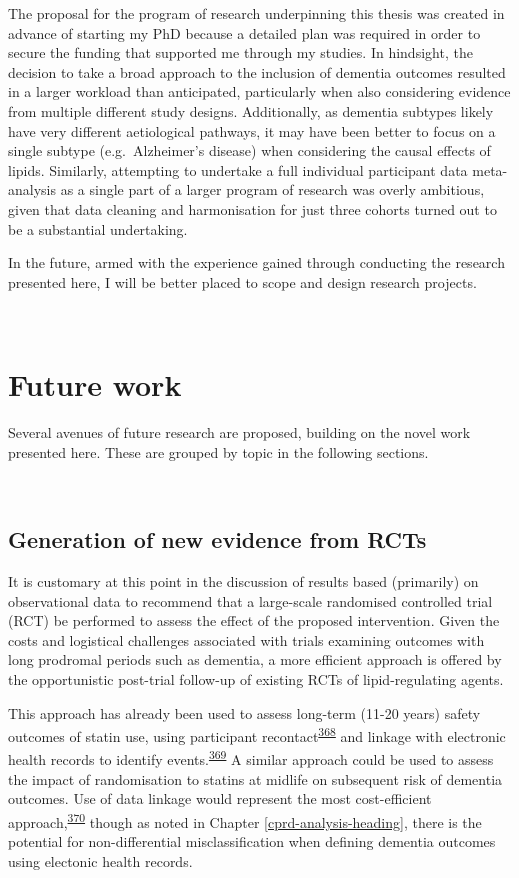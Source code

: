 \documentclass[a4paper, twoside]{templates/ociamthesis}
\begin{document}
The proposal for the program of research underpinning this thesis was created in advance of starting my PhD because a detailed plan was required in order to secure the funding that supported me through my studies. In hindsight, the decision to take a broad approach to the inclusion of dementia outcomes resulted in a larger workload than anticipated, particularly when also considering evidence from multiple different study designs. Additionally, as dementia subtypes likely have very different aetiological pathways, it may have been better to focus on a single subtype (e.g.~Alzheimer's disease) when considering the causal effects of lipids. Similarly, attempting to undertake a full individual participant data meta-analysis as a single part of a larger program of research was overly ambitious, given that data cleaning and harmonisation for just three cohorts turned out to be a substantial undertaking.

In the future, armed with the experience gained through conducting the research presented here, I will be better placed to scope and design research projects.

~

\hypertarget{future-work-1}{%
\section{Future work}\label{future-work-1}}

Several avenues of future research are proposed, building on the novel work presented here. These are grouped by topic in the following sections.

~

\hypertarget{generation-of-new-evidence-from-rcts}{%
\subsection{Generation of new evidence from RCTs}\label{generation-of-new-evidence-from-rcts}}

It is customary at this point in the discussion of results based (primarily) on observational data to recommend that a large-scale randomised controlled trial (RCT) be performed to assess the effect of the proposed intervention. Given the costs and logistical challenges associated with trials examining outcomes with long prodromal periods such as dementia, a more efficient approach is offered by the opportunistic post-trial follow-up of existing RCTs of lipid-regulating agents.

This approach has already been used to assess long-term (11-20 years) safety outcomes of statin use, using participant recontact\textsuperscript{\protect\hyperlink{ref-group2011}{368}} and linkage with electronic health records to identify events.\textsuperscript{\protect\hyperlink{ref-ford2016}{369}} A similar approach could be used to assess the impact of randomisation to statins at midlife on subsequent risk of dementia outcomes. Use of data linkage would represent the most cost-efficient approach,\textsuperscript{\protect\hyperlink{ref-llewellyn-bennett2018}{370}} though as noted in Chapter \ref{cprd-analysis-heading}, there is the potential for non-differential misclassification when defining dementia outcomes using electonic health records.
\end{document}
